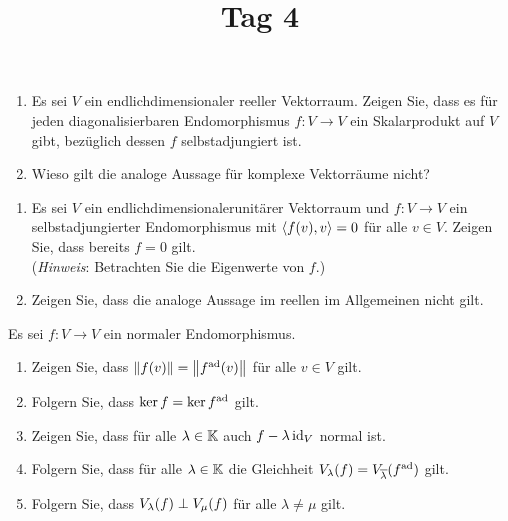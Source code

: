 \documentclass[a4paper, 10pt]{scrartcl}
\title{Tag 4}
\author{}
\date{}
\begin{document}
\begin{question}
  \begin{enumerate}
    \item
      Es sei $V$ ein endlichdimensionaler reeller Vektorraum.
      Zeigen Sie, dass es für jeden diagonalisierbaren Endomorphismus $f \colon V \to V$ ein Skalarprodukt auf $V$ gibt, bezüglich dessen $f$ selbstadjungiert ist.
    \item
      Wieso gilt die analoge Aussage für komplexe Vektorräume nicht?
  \end{enumerate}
\end{question}





\begin{question}
  \begin{enumerate}
    \item
      Es sei $V$ ein endlichdimensionalerunitärer Vektorraum und $f \colon V \to V$ ein selbstadjungierter Endomorphismus mit $\left\langle f(v), v \right\rangle = 0$ für alle $v \in V$.
      Zeigen Sie, dass bereits $f = 0$ gilt.\\
      (\emph{Hinweis}:
      Betrachten Sie die Eigenwerte von $f$.)
    \item
      Zeigen Sie, dass die analoge Aussage im reellen im Allgemeinen nicht gilt.
  \end{enumerate}
\end{question}





\begin{question}
  Es sei $f \colon V \to V$ ein normaler Endomorphismus.
  \begin{enumerate}
    \item
      Zeigen Sie, dass $\left\| f(v) \right\| = \left\| f^{\operatorname{ad}}(v) \right\|$ für alle $v \in V$ gilt.
    \item
      Folgern Sie, dass $\ker f = \ker f^{\operatorname{ad}}$ gilt.
    \item
      Zeigen Sie, dass für alle $\lambda \in \mathbb{K}$ auch $f - \lambda \operatorname{id}_V$ normal ist.
    \item
      Folgern Sie, dass für alle $\lambda \in \mathbb{K}$ die Gleichheit $V_{\lambda}(f) = V_{\overline{\lambda}}(f^{\operatorname{ad}})$ gilt.
    \item
      Folgern Sie, dass $V_{\lambda}(f) \perp V_{\mu}(f)$ für alle $\lambda \neq \mu$ gilt.
  \end{enumerate}
\end{question}
\end{document}
